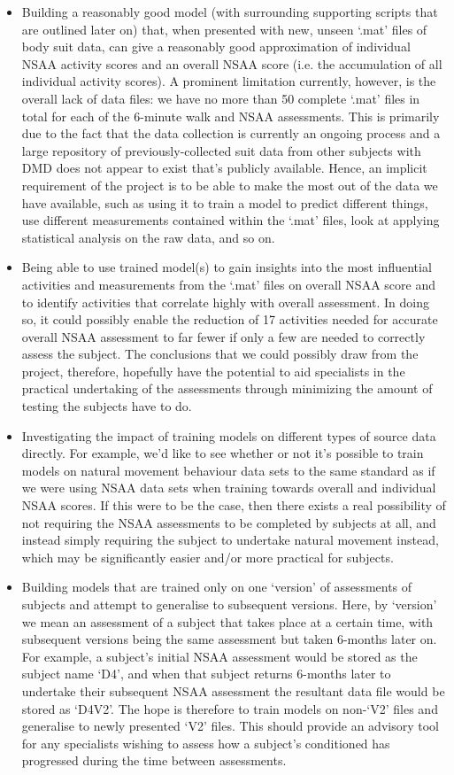 \documentclass[12pt,twoside]{report}
\begin{document}
\begin{itemize}
	\item Building a reasonably good model (with surrounding supporting scripts that are outlined later on) that, when presented with new, unseen ‘.mat’ files of body suit data, can give a reasonably good approximation of individual NSAA activity scores and an overall NSAA score (i.e. the accumulation of all individual activity scores). A prominent limitation currently, however, is the overall lack of data files: we have no more than 50 complete ‘.mat’ files in total for each of the  6-minute walk and NSAA assessments. This is primarily due to the fact that the data collection is currently an ongoing process and a large repository of previously-collected suit data from other subjects with DMD does not appear to exist that’s publicly available. Hence, an implicit requirement of the project is to be able to make the most out of the data we have available, such as using it to train a model to predict different things, use different measurements contained within the ‘.mat’ files, look at applying statistical analysis on the raw data, and so on.
	\item Being able to use trained model(s) to gain insights into the most influential activities and measurements from the ‘.mat’ files on overall NSAA score and to identify activities that correlate highly with overall assessment. In doing so, it could possibly enable the reduction of 17 activities needed for accurate overall NSAA assessment to far fewer if only a few are needed to correctly assess the subject. The conclusions that we could possibly draw from the project, therefore, hopefully have the potential to aid specialists in the practical undertaking of the assessments through minimizing the amount of testing the subjects have to do.
	\item Investigating the impact of training models on different types of source data directly. For example, we’d like to see whether or not it’s possible to train models on natural movement behaviour data sets to the same standard as if we were using NSAA data sets when training towards overall and individual NSAA scores. If this were to be the case, then there exists a real possibility of not requiring the NSAA assessments to be completed by subjects at all, and instead simply requiring the subject to undertake natural movement instead, which may be significantly easier and/or more practical for subjects.
	\item Building models that are trained only on one ‘version’ of assessments of subjects and attempt to generalise to subsequent versions. Here, by ‘version’ we mean an assessment of a subject that takes place at a certain time, with subsequent versions being the same assessment but taken 6-months later on. For example, a subject’s initial NSAA assessment would be stored as the subject name ‘D4’, and when that subject returns 6-months later to undertake their subsequent NSAA assessment the resultant data file would be stored as ‘D4V2’. The hope is therefore to train models on non-‘V2’ files and generalise to newly presented ‘V2’ files. This should provide an advisory tool for any specialists wishing to assess how a subject’s conditioned has progressed during the time between assessments.

\end{itemize}
\end{document}
